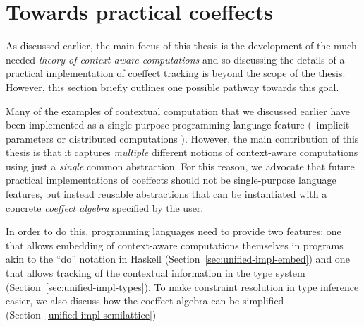 %                                                                   
%                                                                

\section{Towards practical coeffects}
\label{sec:unified-impl}

As discussed earlier, the main focus of this thesis is the development of the much needed 
\emph{theory of context-aware computations} and so discussing the details of a practical 
implementation of coeffect tracking is beyond the scope of the thesis. However, this section
briefly outlines one possible pathway towards this goal.

Many of the examples of contextual computation that we discussed earlier have been implemented as 
a single-purpose programming language feature (\eg~implicit parameters \cite{app-implicit-parameters} 
or distributed computations \cite{app-distributed-ml5,app-distributed-links}). However, 
the main contribution of this thesis is that it captures
\emph{multiple} different notions of context-aware computations using just a \emph{single}
common abstraction. For this reason, we advocate that future practical implementations of
coeffects should not be single-purpose language features, but instead reusable abstractions that
can be instantiated with a concrete \emph{coeffect algebra} specified by the user.

In order to do this, programming languages need to provide two features; one that allows 
embedding of context-aware computations themselves in programs akin to the ``do'' notation
in Haskell (Section~\ref{sec:unified-impl-embed}) and one that allows tracking of the 
contextual information in the type system (Section~\ref{sec:unified-impl-types}). To make
constraint resolution in type inference easier, we also discuss how the coeffect algebra 
can be simplified (Section~\ref{unified-impl-semilattice})

